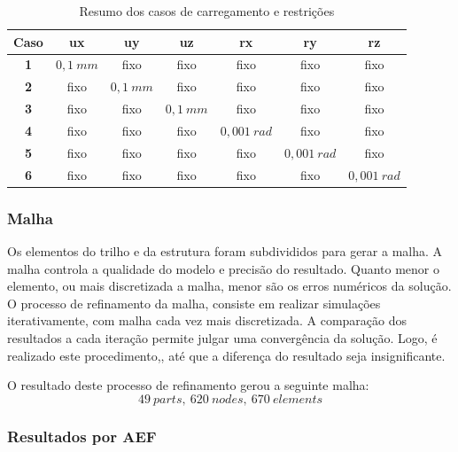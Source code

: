\begin{table}[h]
\centering
\caption{Resumo dos casos de carregamento e restrições}
\label{tab::casoscarreg}
\begin{tabular}{@{}ccccccc@{}}
\toprule
\textbf{Caso} & \textbf{ux} & \textbf{uy} & \textbf{uz} & \textbf{rx} & \textbf{ry} & \textbf{rz} \\ \midrule
\textbf{1}    & $0,1~mm$           & fixo        & fixo        & fixo        &
fixo & fixo        \\
\textbf{2}    & fixo        & $0,1~mm$            & fixo        & fixo        &
fixo        & fixo        \\
\textbf{3}    & fixo        & fixo        & $0,1~mm$            & fixo        &
fixo        & fixo        \\
\textbf{4}    & fixo        & fixo        & fixo        & $0,001~rad$           
& fixo        & fixo        \\
\textbf{5}    & fixo        & fixo        & fixo        & fixo        &
$0,001~rad$            & fixo        \\
\textbf{6}    & fixo        & fixo        & fixo        & fixo        & fixo    
& $0,001~rad$            \\ \bottomrule
\end{tabular}
\end{table}


\subsubsection{Malha}

Os elementos do trilho e da estrutura foram subdivididos para gerar a malha. A
malha controla a qualidade do modelo e precisão do resultado.
Quanto menor o elemento, ou mais discretizada a malha, menor são os erros
numéricos da solução. O processo de refinamento da malha, consiste em realizar
simulações iterativamente, com malha cada vez mais discretizada. A comparação
dos resultados a cada iteração permite julgar uma convergência da solução. Logo,
é realizado este procedimento,, até que a diferença do resultado seja
insignificante.

O resultado deste processo de refinamento gerou a seguinte malha:
%
$$ 49~parts,~ 620~nodes,~ 670~elements $$
%

\subsubsection{Resultados por AEF}


